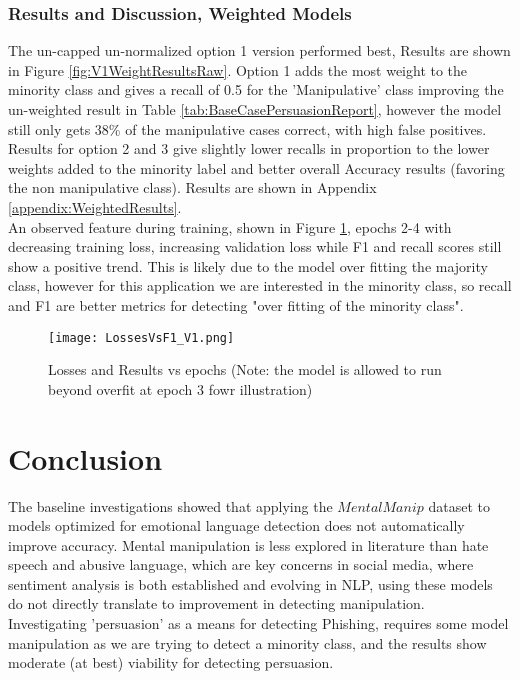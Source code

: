 \documentclass[
	letterpaper, %
	12pt, %
	unnumberedsections, %
	twoside, %
]{LTJournalArticle}
\begin{document}
\subsubsection{Results and Discussion, Weighted Models}
The un-capped un-normalized option 1 version performed best, Results are shown in Figure \ref{fig:V1WeightResultsRaw}. Option 1 adds the most weight to the minority class and gives a recall of 0.5 for the 'Manipulative' class improving the un-weighted result in Table \ref{tab:BaseCasePersuasionReport}, however the model still only gets 38\% of the manipulative cases correct, with high false positives. Results for option 2 and 3 give slightly lower recalls in proportion to the lower weights added to the minority label and better overall Accuracy results (favoring the non manipulative class). Results are shown in Appendix \ref{appendix:WeightedResults}. \\
An observed feature during training, shown in Figure \ref{fig:V1EpochPlot}, epochs 2-4 with decreasing training loss, increasing validation loss while F1 and recall scores still show a positive trend. This is likely due to the model over fitting the majority class, however for this application we are interested in the minority class, so recall and F1 are better metrics for detecting "over fitting of the minority class".

\begin{figure}[h]
	\centering
	\texttt{[image: LossesVsF1\_V1.png]}
	\caption{Losses and Results vs epochs (Note: the model is allowed to run beyond overfit at epoch 3 fowr illustration)}
	\label{fig:V1EpochPlot}
\end{figure}%







\section{Conclusion}

The baseline investigations showed that applying the $MentalManip$ dataset to models optimized for emotional language detection does not automatically improve accuracy. Mental manipulation is less explored in literature than hate speech and abusive language, which are key concerns in social media, where sentiment analysis is both established and evolving in NLP, using these models do not directly translate to improvement in detecting manipulation. \\
Investigating 'persuasion' as a means for detecting Phishing, requires some model manipulation as we are trying to detect a minority class, and the results show moderate (at best) viability for detecting persuasion.
\end{document}
